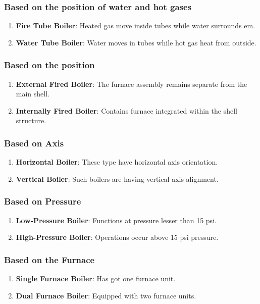 \subsubsection{Based on the position of water and hot gases}
\begin{enumerate}
    \item \textbf{Fire Tube Boiler}: Heated gas move inside tubes while water surrounds em.
    \item \textbf{Water Tube Boiler}: Water moves in tubes while hot gas heat from outside.
\end{enumerate}

\subsubsection{Based on the position}
\begin{enumerate}
    \item \textbf{External Fired Boiler}: The furnace assembly remains separate from the main shell.
    \item \textbf{Internally Fired Boiler}: Contains furnace integrated within the shell structure.
\end{enumerate}

\subsubsection{Based on Axis}
\begin{enumerate}
    \item \textbf{Horizontal Boiler}: These type have horizontal axis orientation.
    \item \textbf{Vertical Boiler}: Such boilers are having vertical axis alignment.
\end{enumerate}

\subsubsection{Based on Pressure}
\begin{enumerate}
    \item \textbf{Low-Pressure Boiler}: Functions at pressure lesser than 15 psi.
    \item \textbf{High-Pressure Boiler}: Operations occur above 15 psi pressure.
\end{enumerate}

\subsubsection{Based on the Furnace}
\begin{enumerate}
    \item \textbf{Single Furnace Boiler}: Has got one furnace unit.
    \item \textbf{Dual Furnace Boiler}: Equipped with two furnace units.
\end{enumerate}

